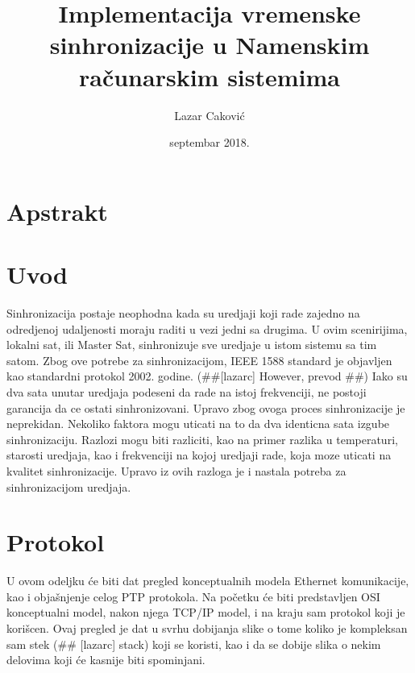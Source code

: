 \documentclass[a4paper,12pt, master]{etf}
\title{Implementacija vremenske sinhronizacije u Namenskim ra\v{c}unarskim sistemima}
\author{Lazar Caković}
\date{septembar 2018.}
\begin{document}
	\maketitle

	\tableofcontents

	\listoffigures

	\newpage

	\chapter{Apstrakt}

	\newpage

	\chapter{Uvod}

    Sinhronizacija postaje neophodna kada su uredjaji koji rade zajedno na odredjenoj 
	udaljenosti moraju raditi u vezi jedni sa drugima. U ovim scenirijima, lokalni sat, ili 
	Master Sat, sinhronizuje sve uredjaje u istom sistemu sa tim satom. Zbog ove potrebe za 
	sinhronizacijom, IEEE 1588 standard je objavljen kao standardni protokol 2002. godine.
	(\#\#[lazarc] However, prevod \#\#) Iako su dva sata unutar uredjaja podeseni da rade na 
	istoj frekvenciji, ne postoji garancija da ce ostati sinhronizovani. Upravo zbog ovoga 
	proces sinhronizacije je neprekidan. Nekoliko faktora mogu uticati na to da dva identicna 
	sata izgube sinhronizaciju. Razlozi mogu biti razliciti, kao na primer razlika u 
	temperaturi, starosti uredjaja, kao i frekvenciji na kojoj uredjaji rade, koja moze 
	uticati na kvalitet sinhronizacije. Upravo iz ovih razloga je i nastala potreba za 
	sinhronizacijom uredjaja.
	
	\newpage

    \chapter{Protokol}
    
    U ovom odeljku \'{c}e biti dat pregled konceptualnih modela Ethernet komunikacije, kao i obja\v{s}njenje 
    celog PTP protokola. Na po\v{c}etku \'{c}e biti predstavljen OSI konceptualni model, nakon njega TCP/IP 
    model, i na kraju sam protokol koji je kori\v{s}cen. Ovaj pregled je dat u svrhu dobijanja slike o tome 
    koliko je kompleksan sam stek (\#\# [lazarc] stack) koji se koristi, kao i da se dobije slika o nekim 
    delovima koji \'{c}e kasnije biti spominjani.
\end{document}
